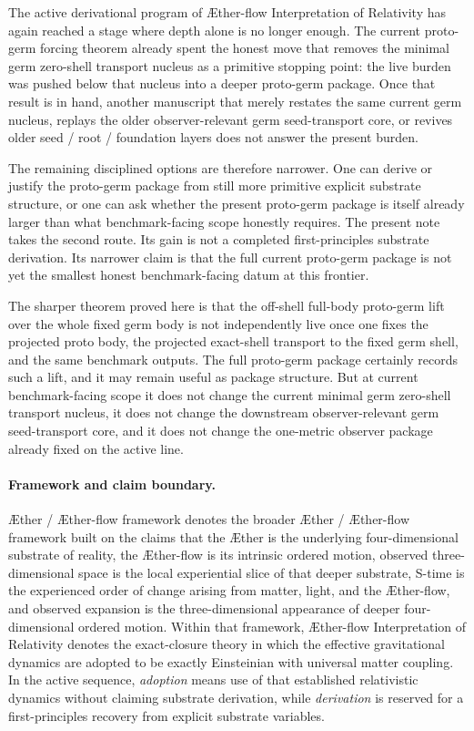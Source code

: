 \documentclass[11pt]{article}
\newcommand{\Aether}{\AE{}ther}
\newcommand{\Aflow}{\AE{}ther-flow}
\newcommand{\TheoryName}{\Aflow{} Interpretation of Relativity}
\newcommand{\TheoryProgram}{\Aether{} / \Aflow{} framework}
\begin{document}
The active derivational program of \TheoryName{} has again reached a stage where depth alone is no longer enough. The current proto-germ forcing theorem already spent the honest move that removes the minimal germ zero-shell transport nucleus as a primitive stopping point: the live burden was pushed below that nucleus into a deeper proto-germ package. Once that result is in hand, another manuscript that merely restates the same current germ nucleus, replays the older observer-relevant germ seed-transport core, or revives older seed / root / foundation layers does not answer the present burden.

The remaining disciplined options are therefore narrower. One can derive or justify the proto-germ package from still more primitive explicit substrate structure, or one can ask whether the present proto-germ package is itself already larger than what benchmark-facing scope honestly requires. The present note takes the second route. Its gain is not a completed first-principles substrate derivation. Its narrower claim is that the full current proto-germ package is not yet the smallest honest benchmark-facing datum at this frontier.

The sharper theorem proved here is that the off-shell full-body proto-germ lift over the whole fixed germ body is not independently live once one fixes the projected proto body, the projected exact-shell transport to the fixed germ shell, and the same benchmark outputs. The full proto-germ package certainly records such a lift, and it may remain useful as package structure. But at current benchmark-facing scope it does not change the current minimal germ zero-shell transport nucleus, it does not change the downstream observer-relevant germ seed-transport core, and it does not change the one-metric observer package already fixed on the active line.

\paragraph{Framework and claim boundary.}
\TheoryProgram{} denotes the broader \Aether{} / \Aflow{} framework built on the claims that the \Aether{} is the underlying four-dimensional substrate of reality, the \Aflow{} is its intrinsic ordered motion, observed three-dimensional space is the local experiential slice of that deeper substrate, S-time is the experienced order of change arising from matter, light, and the \Aflow{}, and observed expansion is the three-dimensional appearance of deeper four-dimensional ordered motion. Within that framework, \TheoryName{} denotes the exact-closure theory in which the effective gravitational dynamics are adopted to be exactly Einsteinian with universal matter coupling. In the active sequence, \emph{adoption} means use of that established relativistic dynamics without claiming substrate derivation, while \emph{derivation} is reserved for a first-principles recovery from explicit substrate variables.
\end{document}
